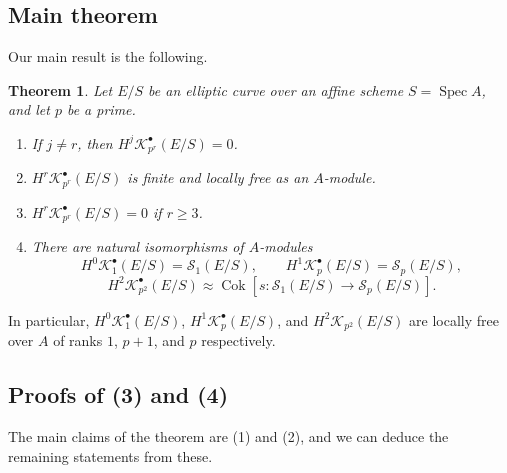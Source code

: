 \documentclass[11pt]{amsart}
\numberwithin{equation}{section}
\theoremstyle{plain}
\newtheorem{thm}[subsection]{Theorem}
\theoremstyle{remark}
\theoremstyle{plain}
\begin{document}
\subsection{Main theorem}

Our main result is the following.
\begin{thm}\label{main-thm}
Let $E/S$ be an elliptic curve over an affine scheme $S={\operatorname{Spec}} A$, and
let $p$ be a prime.
\begin{enumerate}
\item If $j\neq r$, then $H^j{\mathscr{K}}_{p^r}^\bullet(E/S)=0$.
\item $H^r{\mathscr{K}}_{p^r}^\bullet(E/S)$ is finite and locally free as an
  $A$-module.
\item $H^r{\mathscr{K}}_{p^r}^\bullet(E/S)=0$ if $r\geq 3$.
\item There are natural isomorphisms of $A$-modules
\[
H^0{\mathscr{K}}_{1}^\bullet(E/S)={\mathscr{S}}_1(E/S),\qquad
H^1{\mathscr{K}}_p^\bullet(E/S)={\mathscr{S}}_p(E/S),
\]
\[
H^2{\mathscr{K}}_{p^2}^\bullet(E/S)\approx \operatorname{Cok}[s\colon {\mathscr{S}}_1(E/S){\rightarrow} {\mathscr{S}}_p(E/S)].
\]
\end{enumerate}
\end{thm}
In particular, $H^0{\mathscr{K}}_1^\bullet(E/S)$, $H^1{\mathscr{K}}_p^\bullet(E/S)$, and
$H^2{\mathscr{K}}_{p^2}(E/S)$ are locally free over $A$ of ranks $1$, $p+1$, and
$p$ respectively.

\subsection{Proofs of (3) and (4)}

The main claims of the theorem are (1) and (2), and we can deduce the
remaining statements from these.
\end{document}
